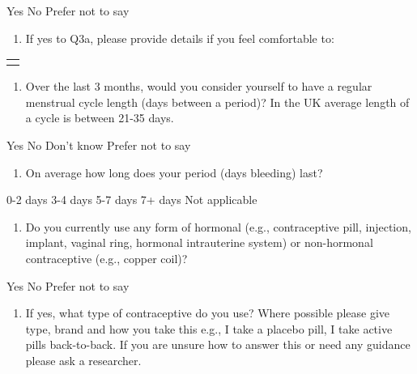 Yes No Prefer not to say

\begin{enumerate}
\def\labelenumi{\alph{enumi}.}
\setcounter{enumi}{1}
\item
  If yes to Q3a, please provide details if you feel comfortable to:
\end{enumerate}

\begin{longtable}[]{@{}
  >{\raggedright\arraybackslash}p{}@{}}
\toprule\noalign{}
\begin{minipage}[b]{\linewidth}\raggedright
\end{minipage} \\
\midrule\noalign{}
\endhead
\bottomrule\noalign{}
\endlastfoot
\end{longtable}

\begin{enumerate}
\def\labelenumi{\arabic{enumi})}
\setcounter{enumi}{3}
\item
  Over the last 3 months, would you consider yourself to have a regular
  menstrual cycle length (days between a period)? In the UK average
  length of a cycle is between 21-35 days.
\end{enumerate}

Yes No Don't know Prefer not to say

\begin{enumerate}
\def\labelenumi{\arabic{enumi})}
\setcounter{enumi}{4}
\item
  On average how long does your period (days bleeding) last?
\end{enumerate}

0-2 days 3-4 days 5-7 days 7+ days Not applicable

\begin{enumerate}
\def\labelenumi{\arabic{enumi})}
\setcounter{enumi}{5}
\item
  Do you currently use any form of hormonal (e.g., contraceptive pill,
  injection, implant, vaginal ring, hormonal intrauterine system) or
  non-hormonal contraceptive (e.g., copper coil)?
\end{enumerate}

Yes No Prefer not to say

\begin{enumerate}
\def\labelenumi{\arabic{enumi})}
\setcounter{enumi}{6}
\item
  If yes, what type of contraceptive do you use? Where possible please
  give type, brand and how you take this e.g., I take a placebo pill, I
  take active pills back-to-back. If you are unsure how to answer this
  or need any guidance please ask a researcher.
\end{enumerate}

